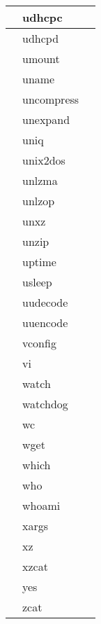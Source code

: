 \begin{longtable}{llp{64mm}}
 & udhcpc &  \\ \hline
 & udhcpd &  \\ \hline
 & umount &  \\ \hline
 & uname &  \\ \hline
 & uncompress &  \\ \hline
 & unexpand &  \\ \hline
 & uniq &  \\ \hline
 & unix2dos &  \\ \hline
 & unlzma &  \\ \hline
 & unlzop &  \\ \hline
 & unxz &  \\ \hline
 & unzip &  \\ \hline
 & uptime &  \\ \hline
 & usleep &  \\ \hline
 & uudecode &  \\ \hline
 & uuencode &  \\ \hline
 & vconfig &  \\ \hline
 & vi &  \\ \hline
 & watch &  \\ \hline
 & watchdog &  \\ \hline
 & wc &  \\ \hline
 & wget &  \\ \hline
 & which &  \\ \hline
 & who &  \\ \hline
 & whoami &  \\ \hline
 & xargs &  \\ \hline
 & xz &  \\ \hline
 & xzcat &  \\ \hline
 & yes &  \\ \hline
 & zcat &  \\ \hline

\end{longtable}

